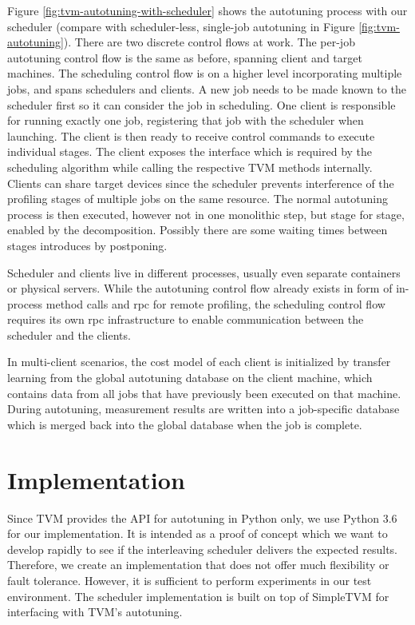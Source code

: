 Figure \ref{fig:tvm-autotuning-with-scheduler} shows the autotuning process with our scheduler (compare with scheduler-less, single-job autotuning in Figure \ref{fig:tvm-autotuning}). There are two discrete control flows at work. The per-job autotuning control flow is the same as before, spanning client and target machines. The scheduling control flow is on a higher level incorporating multiple jobs, and spans schedulers and clients. A new job needs to be made known to the scheduler first so it can consider the job in scheduling. One client is responsible for running exactly one job, registering that job with the scheduler when launching. The client is then ready to receive control commands to execute individual stages. The client exposes the interface which is required by the scheduling algorithm while calling the respective TVM methods internally. Clients can share target devices since the scheduler prevents interference of the profiling stages of multiple jobs on the same resource. The normal autotuning process is then executed, however not in one monolithic step, but stage for stage, enabled by the decomposition. Possibly there are some waiting times between stages introduces by postponing.

Scheduler and clients live in different processes, usually even separate containers or physical servers. While the autotuning control flow already exists in form of in-process method calls and \gls{rpc} for remote profiling, the scheduling control flow requires its own \gls{rpc} infrastructure to enable communication between the scheduler and the clients.

In multi-client scenarios, the cost model of each client is initialized by transfer learning from the global autotuning database on the client machine, which contains data from all jobs that have previously been executed on that machine. During autotuning, measurement results are written into a job-specific database which is merged back into the global database when the job is complete.

\section{Implementation}
Since TVM provides the API for autotuning in Python only, we use Python 3.6 for our implementation. It is intended as a proof of concept which we want to develop rapidly to see if the interleaving scheduler delivers the expected results. Therefore, we create an implementation that does not offer much flexibility or fault tolerance. However, it is sufficient to perform experiments in our test environment. The scheduler implementation is built on top of SimpleTVM for interfacing with TVM's autotuning.

